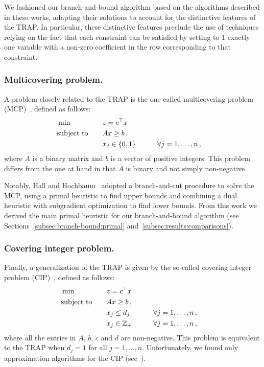 \documentclass[runningheads]{llncs}
\begin{document}
We fashioned our branch-and-bound algorithm based on the algorithms described in these works, adapting their solutions to account for the distinctive features of the TRAP. In particular, these distinctive features preclude the use of techniques relying on the fact that each constraint can be satisfied by setting to 1 exactly one variable with a non-zero coefficient in the row corresponding to that constraint.

\subsubsection{Multicovering problem.} A problem closely related to the TRAP is the one called multicovering problem (MCP)~\cite{hall-hochbaum-1986-fast-approximation, hall-hochbaum-1992-multicovering}, defined as follows:
\begin{alignat}{3}
  &\min & \quad & z = c^\top x \notag\\
  &\text{subject to}  &       & Ax \ge b \, , \notag\\
  &                   &       & x_j \in \{0, 1\}  & \qquad & \forall j=1,\dots,n \, , \notag
\end{alignat}
where $A$ is a binary matrix and $b$ is a vector of positive integers. This problem differs from the one at hand in that $A$ is binary and not simply non-negative.

Notably, Hall and Hochbaum~\cite{hall-hochbaum-1992-multicovering} adopted a branch-and-cut procedure to solve the MCP, using a primal heuristic to find upper bounds and combining a dual heuristic with subgradient optimization to find lower bounds. From this work we derived the main primal heuristic for our branch-and-bound algorithm (see Sections~\ref{subsec:branch-bound:primal} and~\ref{subsec:results:comparisons}). 

\subsubsection{Covering integer problem.} Finally, a generalization of the TRAP is given by the so-called covering integer problem (CIP)~\cite{kolliopoulos-2003-approximating,kolliopoulos-2005-approximation}, defined as follows:
\begin{alignat}{3}
  &\min & \quad & z = c^\top x \notag\\
  &\text{subject to}  &       & Ax \ge b \, , \notag\\
  &                   &       & x_j \le d_j & \qquad & \forall j=1,\dots,n \, , \notag\\
  &                   &       & x_j \in \mathbb{Z}_{+}  & \qquad &  \forall j=1,\dots,n \, , \notag
\end{alignat}
where all the entries in $A$, $b$, $c$ and $d$ are non-negative. This problem is equivalent to the TRAP when $d_j = 1$ for all $j=1,\dots,n$. Unfortunately, we found only approximation algorithms for the CIP (see~\cite{kolliopoulos-2003-approximating,kolliopoulos-2005-approximation}).
\end{document}
